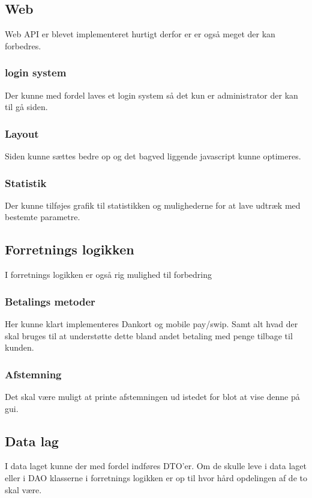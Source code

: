\subsection{Web}
Web \gls{API} er blevet implementeret hurtigt derfor er er også meget der kan forbedres.

\subsubsection{login system}
Der kunne med fordel laves et login system så det kun er administrator der kan til gå siden.

\subsubsection{Layout}
Siden kunne sættes bedre op og det bagved liggende javascript kunne optimeres.

\subsubsection{Statistik}
Der kunne tilføjes grafik til statistikken og mulighederne for at lave udtræk med bestemte parametre.

\subsection{Forretnings logikken}
I forretnings logikken er også rig mulighed til forbedring

\subsubsection{Betalings metoder}
Her kunne klart implementeres Dankort og mobile pay/swip. 
Samt alt hvad der skal bruges til at understøtte dette bland andet betaling med penge tilbage til kunden.

\subsubsection{Afstemning}
Det skal være muligt at printe afstemningen ud istedet for blot at vise denne på gui. 

\subsection{Data lag}
I data laget kunne der med fordel indføres \gls{DTO}'er. Om de skulle leve i data laget eller i \gls{DAO} klasserne i forretnings logikken er op til hvor hård opdelingen af de to skal være.